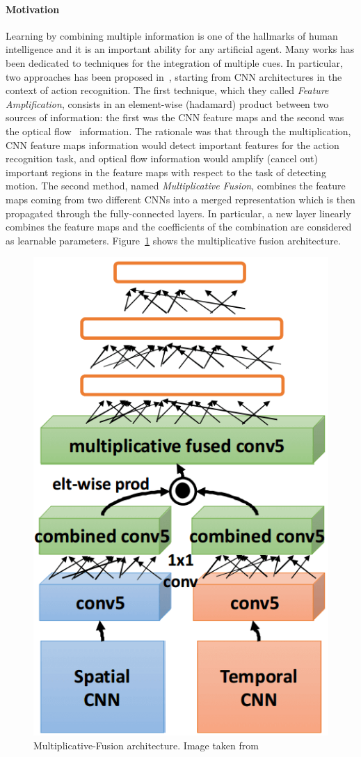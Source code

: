 \documentclass[../main.tex]{subfiles}
\begin{document}
    \paragraph{Motivation}
    Learning by combining multiple information is one of the hallmarks of human intelligence and it is an important ability for any artificial
    agent. Many works has been dedicated to techniques for the integration of multiple cues. In particular, two approaches has been proposed in~\cite{multfusion},
    starting from CNN architectures in the context of action recognition.
    The first technique, which they called \textit{Feature Amplification},
    consists in an element-wise (hadamard) product between two sources of information: the first was the CNN feature maps and the second
    was the optical flow~\cite{opticalflow} information. The rationale was that through the multiplication, CNN feature maps information
    would detect important features for the action recognition task, and optical flow information would amplify (cancel out) important regions
    in the feature maps with respect to the task of detecting motion.
    The second method, named \emph{Multiplicative Fusion}, combines
    the feature maps coming from two different CNNs into a merged representation which is then propagated through the fully-connected layers.
    In particular, a new layer linearly combines the feature maps and the coefficients of the combination are considered as learnable parameters.
    Figure~\ref{fig:multfusion} shows the multiplicative fusion architecture.

    \begin{figure}[h!]
        \centering{}
        \includegraphics[width=.5\linewidth]{./img/multfusion.png}
        \caption{Multiplicative-Fusion architecture. Image taken from~\cite{multfusion}}\label{fig:multfusion}
    \end{figure}
\end{document}
